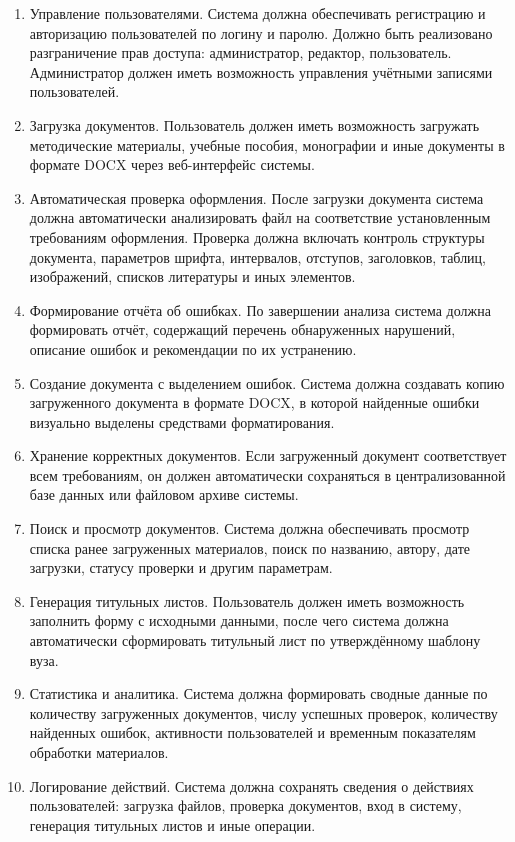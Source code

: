 \begin{enumerate}
	\item {Управление пользователями.} Система должна обеспечивать регистрацию и авторизацию пользователей по логину и паролю. Должно быть реализовано разграничение прав доступа: администратор, редактор, пользователь. Администратор должен иметь возможность управления учётными записями пользователей.
	
	\item {Загрузка документов.} Пользователь должен иметь возможность загружать методические материалы, учебные пособия, монографии и иные документы в формате DOCX через веб-интерфейс системы.
	
	\item {Автоматическая проверка оформления.} После загрузки документа система должна автоматически анализировать файл на соответствие установленным требованиям оформления. Проверка должна включать контроль структуры документа, параметров шрифта, интервалов, отступов, заголовков, таблиц, изображений, списков литературы и иных элементов.
	
	\item {Формирование отчёта об ошибках.} По завершении анализа система должна формировать отчёт, содержащий перечень обнаруженных нарушений, описание ошибок и рекомендации по их устранению.
	
	\item {Создание документа с выделением ошибок.} Система должна создавать копию загруженного документа в формате DOCX, в которой найденные ошибки визуально выделены средствами форматирования.
	
	\item {Хранение корректных документов.} Если загруженный документ соответствует всем требованиям, он должен автоматически сохраняться в централизованной базе данных или файловом архиве системы.
	
	\item {Поиск и просмотр документов.} Система должна обеспечивать просмотр списка ранее загруженных материалов, поиск по названию, автору, дате загрузки, статусу проверки и другим параметрам.
	
	\item {Генерация титульных листов.} Пользователь должен иметь возможность заполнить форму с исходными данными, после чего система должна автоматически сформировать титульный лист по утверждённому шаблону вуза.
	
	\item {Статистика и аналитика.} Система должна формировать сводные данные по количеству загруженных документов, числу успешных проверок, количеству найденных ошибок, активности пользователей и временным показателям обработки материалов.
	
	\item {Логирование действий.} Система должна сохранять сведения о действиях пользователей: загрузка файлов, проверка документов, вход в систему, генерация титульных листов и иные операции.
\end{enumerate}

